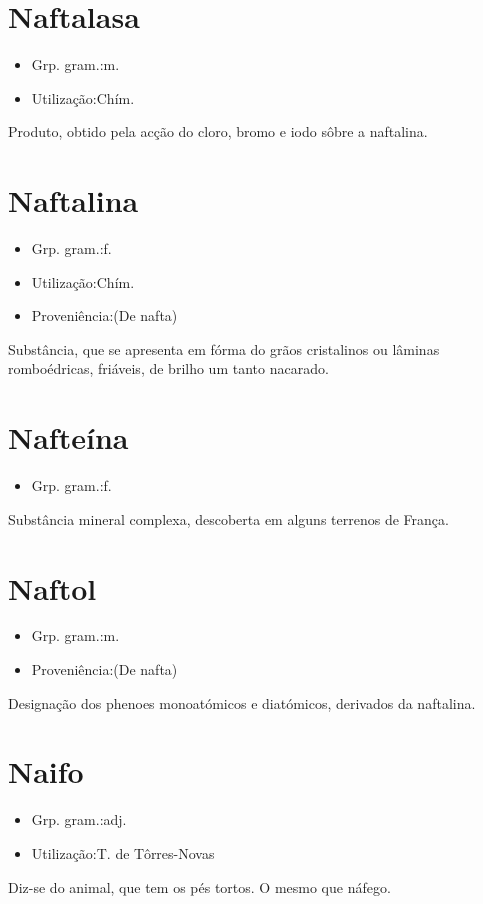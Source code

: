 \section{Naftalasa}
\begin{itemize}
\item {Grp. gram.:m.}
\end{itemize}
\begin{itemize}
\item {Utilização:Chím.}
\end{itemize}
Produto, obtido pela acção do cloro, bromo e iodo sôbre a naftalina.
\section{Naftalina}
\begin{itemize}
\item {Grp. gram.:f.}
\end{itemize}
\begin{itemize}
\item {Utilização:Chím.}
\end{itemize}
\begin{itemize}
\item {Proveniência:(De \textunderscore nafta\textunderscore )}
\end{itemize}
Substância, que se apresenta em fórma do grãos cristalinos ou lâminas romboédricas, friáveis, de brilho um tanto nacarado.
\section{Nafteína}
\begin{itemize}
\item {Grp. gram.:f.}
\end{itemize}
Substância mineral complexa, descoberta em alguns terrenos de França.
\section{Naftol}
\begin{itemize}
\item {Grp. gram.:m.}
\end{itemize}
\begin{itemize}
\item {Proveniência:(De \textunderscore nafta\textunderscore )}
\end{itemize}
Designação dos phenoes monoatómicos e diatómicos, derivados da naftalina.
\section{Naifo}
\begin{itemize}
\item {Grp. gram.:adj.}
\end{itemize}
\begin{itemize}
\item {Utilização:T. de Tôrres-Novas}
\end{itemize}
Diz-se do animal, que tem os pés tortos.
O mesmo que \textunderscore náfego\textunderscore .
